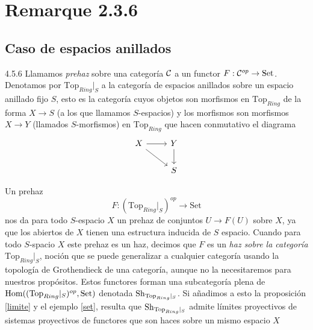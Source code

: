 \documentclass[twoside]{article}
\begin{document}
 




\section{Remarque 2.3.6}


 \subsection{Caso de espacios anillados}

\begin{remarque}{4.5.6}\label{prehaz}
Llamamos \emph{prehaz} sobre una categoría ${\mathcal C}$ a un functor $F:{\mathcal C}^{op}\to\mathrm{Set}$. Denotamos por $\mathrm{Top}_{Ring}|_S$ a la categoría de espacios anillados sobre un espacio anillado fijo $S$, esto es la categoría cuyos objetos son morfismos en $\mathrm{Top}_{Ring}$ de la forma $X\to S$ (a los que llamamos $S$-espacios) y los morfismos son morfismos $X\to Y$ (llamados $S$-morfismos) en $\mathrm{Top}_{Ring}$ que hacen conmutativo el diagrama
\[
\begin{tikzcd}
X\arrow[r]\arrow[dr] & Y\arrow[d]\\
 & S
\end{tikzcd}
\]

Un prehaz 
\begin{equation}\label{representable}
F:(\mathrm{Top}_{Ring}|_S)^{op}\to\mathrm{Set}
\end{equation}
 nos da para todo $S$-espacio $X$ un prehaz de conjuntos $U\to F(U)$ sobre $X$, ya que los abiertos de $X$ tienen una estructura inducida de $S$ espacio. Cuando para todo $S$-spacio $X$ este prehaz es un haz, decimos que $F$ es un \emph{haz sobre la categoría} $\mathrm{Top}_{Ring}|_S$, noción que se puede generalizar a cualquier categoría usando la topología de Grothendieck de una categoría, aunque no la necesitaremos para nuestros propósitos. Estos functores forman una subcategoría plena de $\operatorname{Hom}((\mathrm{Top}_{Ring}|_S)^{op},\mathrm{Set})$ denotada $\operatorname{Sh}_{\mathrm{Top}_{Ring}|_S}$. Si añadimos a esto la proposición \ref{limite} y el ejemplo \ref{set}, resulta que $\operatorname{Sh}_{\mathrm{Top}_{Ring}|_S}$ admite límites proyectivos de sistemas proyectivos de functores que son haces sobre un mismo espacio $X$  %



\end{remarque}
\end{document}
